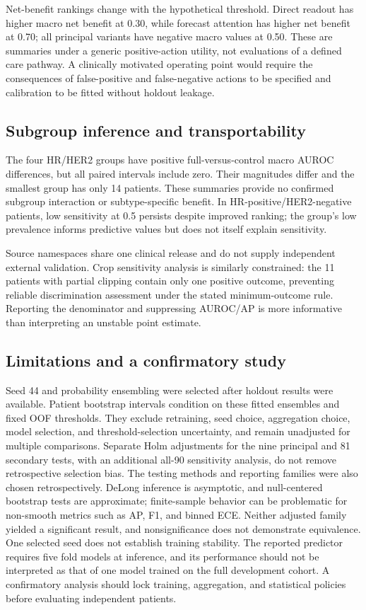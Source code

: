 Net-benefit rankings change with the hypothetical threshold. Direct readout has higher macro net benefit at 0.30, while forecast attention has higher net benefit at 0.70; all principal variants have negative macro values at 0.50. These are summaries under a generic positive-action utility, not evaluations of a defined care pathway. A clinically motivated operating point would require the consequences of false-positive and false-negative actions to be specified and calibration to be fitted without holdout leakage.

\subsection{Subgroup inference and transportability}
The four HR/HER2 groups have positive full-versus-control macro AUROC differences, but all paired intervals include zero. Their magnitudes differ and the smallest group has only 14 patients. These summaries provide no confirmed subgroup interaction or subtype-specific benefit. In HR-positive/HER2-negative patients, low sensitivity at 0.5 persists despite improved ranking; the group's low prevalence informs predictive values but does not itself explain sensitivity.

Source namespaces share one clinical release and do not supply independent external validation. Crop sensitivity analysis is similarly constrained: the 11 patients with partial clipping contain only one positive outcome, preventing reliable discrimination assessment under the stated minimum-outcome rule. Reporting the denominator and suppressing AUROC/AP is more informative than interpreting an unstable point estimate.

\subsection{Limitations and a confirmatory study}
\label{sec:limitations}
Seed 44 and probability ensembling were selected after holdout results were available. Patient bootstrap intervals condition on these fitted ensembles and fixed OOF thresholds. They exclude retraining, seed choice, aggregation choice, model selection, and threshold-selection uncertainty, and remain unadjusted for multiple comparisons. Separate Holm adjustments for the nine principal and 81 secondary tests, with an additional all-90 sensitivity analysis, do not remove retrospective selection bias. The testing methods and reporting families were also chosen retrospectively. DeLong inference is asymptotic, and null-centered bootstrap tests are approximate; finite-sample behavior can be problematic for non-smooth metrics such as AP, F1, and binned ECE. Neither adjusted family yielded a significant result, and nonsignificance does not demonstrate equivalence. One selected seed does not establish training stability. The reported predictor requires five fold models at inference, and its performance should not be interpreted as that of one model trained on the full development cohort. A confirmatory analysis should lock training, aggregation, and statistical policies before evaluating independent patients.

